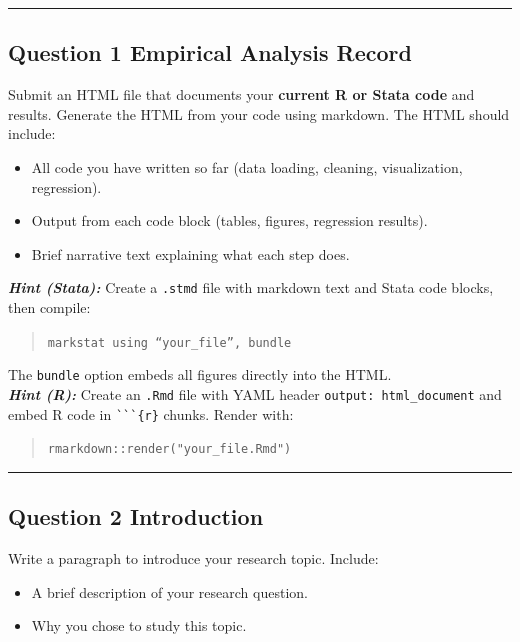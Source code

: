 \documentclass[paper=a4, fontsize=11pt]{scrartcl}
\newcommand{\horrule}[1]{\rule{\linewidth}{#1}}
\begin{document}
\bigskip\horrule{0.4pt}\bigskip


\subsection*{Question 1 \quad Empirical Analysis Record}

Submit an HTML file that documents your \textbf{current R or Stata code} and results. Generate the HTML from your code using markdown. The HTML should include:
\begin{itemize}
  \item All code you have written so far (data loading, cleaning, visualization, regression).
  \item Output from each code block (tables, figures, regression results).
  \item Brief narrative text explaining what each step does.
\end{itemize}

\medskip
\textit{\textbf{Hint (Stata):}} Create a \texttt{.stmd} file with markdown text and Stata code blocks, then compile:
\begin{quote}\texttt{markstat using ``your\_file'', bundle}\end{quote}
The \texttt{bundle} option embeds all figures directly into the HTML. \\

\textit{\textbf{Hint (R):}} Create an \texttt{.Rmd} file with YAML header \texttt{output: html\_document} and embed R code in \texttt{\`{}\`{}\`{}\{r\}} chunks. Render with:
\begin{quote}\texttt{rmarkdown::render("your\_file.Rmd")}\end{quote}

\bigskip\horrule{0.4pt}\bigskip


\subsection*{Question 2 \quad Introduction}

Write a paragraph to introduce your research topic. Include:
\begin{itemize}
  \item A brief description of your research question.
  \item Why you chose to study this topic.
\end{itemize}
\end{document}
